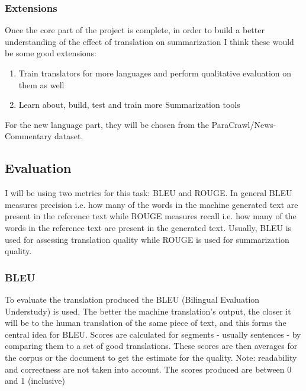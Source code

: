 \documentclass[12pt, a4paper]{article}
\begin{document}
\subsubsection*{Extensions}
Once the core part of the project is complete, in order to build a better understanding of the effect of translation on summarization I think these would be some good extensions: 
\begin{enumerate}
  \item Train translators for more languages and perform qualitative evaluation on them as well
  \item Learn about, build, test and train more Summarization tools
\end{enumerate} 

For the new language part, they will be chosen from the ParaCrawl/News-Commentary dataset. 


\subsection*{Evaluation}
I will be using two metrics for this task: BLEU and ROUGE. In general BLEU measures precision i.e. how many of the words in the machine generated text are present in the reference text while ROUGE measures recall i.e. how many of the words in the reference text are present in the generated text. Usually, BLEU is used for assessing translation quality while ROUGE is used for summarization quality.

\subsubsection*{BLEU}
To evaluate the translation produced the BLEU (Bilingual Evaluation Understudy) is used. The better the machine translation's output, the closer it will be to the human translation of the same piece of text, and this forms the central idea for BLEU. Scores are calculated for segments - usually sentences - by comparing them to a set of good translations. These scores are then averages for the corpus or the document to get the estimate for the quality. Note: readability and correctness are not taken into account. The scores produced are between 0 and 1 (inclusive)
\end{document}
